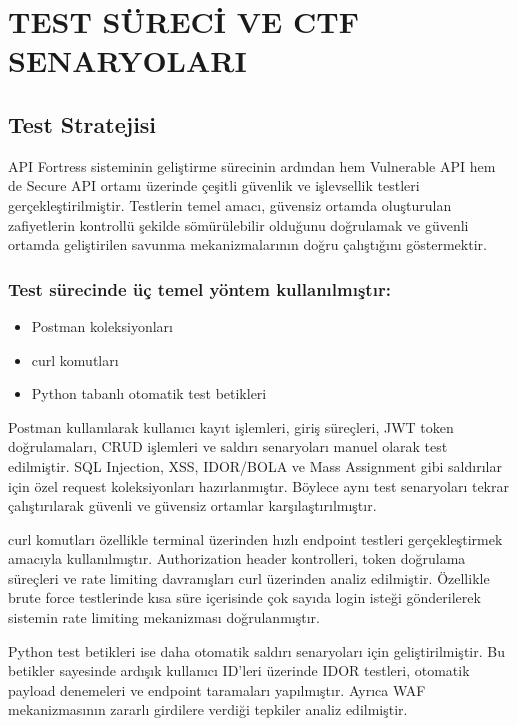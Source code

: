 \section{TEST SÜRECİ VE CTF SENARYOLARI}
\label{bolum9}

\subsection{Test Stratejisi}
\label{test-stratejisi}

API Fortress sisteminin geliştirme sürecinin ardından hem Vulnerable API hem de Secure API ortamı üzerinde çeşitli güvenlik ve işlevsellik testleri gerçekleştirilmiştir. Testlerin temel amacı, güvensiz ortamda oluşturulan zafiyetlerin kontrollü şekilde sömürülebilir olduğunu doğrulamak ve güvenli ortamda geliştirilen savunma mekanizmalarının doğru çalıştığını göstermektir.

\subsubsection{Test sürecinde üç temel yöntem kullanılmıştır:}

\begin{itemize}[leftmargin=*]
    \item Postman koleksiyonları
    \item curl komutları
    \item Python tabanlı otomatik test betikleri
\end{itemize}

Postman kullanılarak kullanıcı kayıt işlemleri, giriş süreçleri, JWT token doğrulamaları, CRUD işlemleri ve saldırı senaryoları manuel olarak test edilmiştir. SQL Injection, XSS, IDOR/BOLA ve Mass Assignment gibi saldırılar için özel request koleksiyonları hazırlanmıştır. Böylece aynı test senaryoları tekrar çalıştırılarak güvenli ve güvensiz ortamlar karşılaştırılmıştır.

curl komutları özellikle terminal üzerinden hızlı endpoint testleri gerçekleştirmek amacıyla kullanılmıştır. Authorization header kontrolleri, token doğrulama süreçleri ve rate limiting davranışları curl üzerinden analiz edilmiştir. Özellikle brute force testlerinde kısa süre içerisinde çok sayıda login isteği gönderilerek sistemin rate limiting mekanizması doğrulanmıştır.

Python test betikleri ise daha otomatik saldırı senaryoları için geliştirilmiştir. Bu betikler sayesinde ardışık kullanıcı ID’leri üzerinde IDOR testleri, otomatik payload denemeleri ve endpoint taramaları yapılmıştır. Ayrıca WAF mekanizmasının zararlı girdilere verdiği tepkiler analiz edilmiştir.

